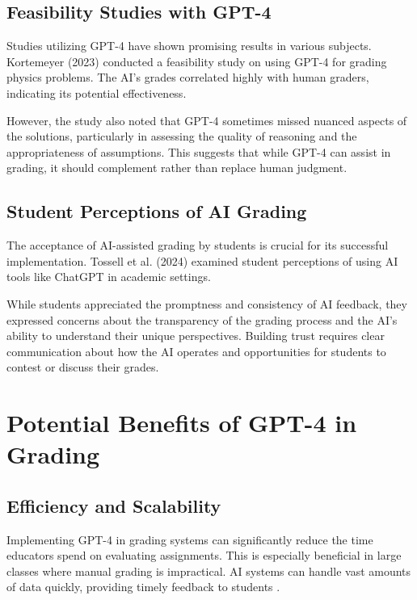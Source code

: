 \documentclass[ms,twoside,print]{nuthesis}
\begin{document}
\subsection{Feasibility Studies with GPT-4}

Studies utilizing GPT-4 have shown promising results in various subjects. Kortemeyer (2023) \cite{Kortemeyer2023} conducted a feasibility study on using GPT-4 for grading physics problems. The AI's grades correlated highly with human graders, indicating its potential effectiveness.

However, the study also noted that GPT-4 sometimes missed nuanced aspects of the solutions, particularly in assessing the quality of reasoning and the appropriateness of assumptions. This suggests that while GPT-4 can assist in grading, it should complement rather than replace human judgment.

\subsection{Student Perceptions of AI Grading}

The acceptance of AI-assisted grading by students is crucial for its successful implementation. Tossell et al. (2024) \cite{Tossell2024} examined student perceptions of using AI tools like ChatGPT in academic settings.

While students appreciated the promptness and consistency of AI feedback, they expressed concerns about the transparency of the grading process and the AI's ability to understand their unique perspectives. Building trust requires clear communication about how the AI operates and opportunities for students to contest or discuss their grades.

\section{Potential Benefits of GPT-4 in Grading}

\subsection{Efficiency and Scalability}

Implementing GPT-4 in grading systems can significantly reduce the time educators spend on evaluating assignments. This is especially beneficial in large classes where manual grading is impractical. AI systems can handle vast amounts of data quickly, providing timely feedback to students \cite{Alto2023}.
\end{document}
